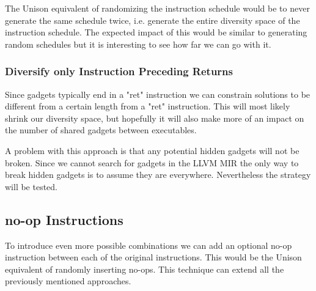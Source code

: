 The Unison equivalent of randomizing the instruction schedule would be to never generate
the same schedule twice, i.e. generate the entire diversity space of the instruction
schedule. The expected impact of this would be similar to generating random schedules but
it is interesting to see how far we can go with it.

\subsubsection{Diversify only Instruction Preceding Returns}

Since gadgets typically end in a "ret" instruction we can constrain solutions to be different
from a certain length from a "ret" instruction. This will most likely shrink our diversity
space, but hopefully it will also make more of an impact on the number of shared gadgets
between executables.

A problem with this approach is that any potential hidden gadgets will not be broken. Since
we cannot search for gadgets in the LLVM MIR the only way to break hidden gadgets is to
assume they are everywhere. Nevertheless the strategy will be tested.

\subsection{no-op Instructions}

To introduce even more possible combinations we can add an optional no-op instruction
between each of the original instructions. This would be the Unison equivalent of randomly
inserting no-ops. This technique can extend all the previously mentioned approaches.

